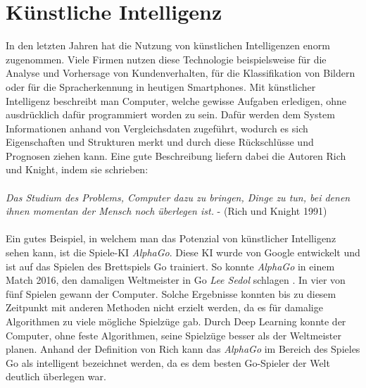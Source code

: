 \section{Künstliche Intelligenz}\label{s.ki}
In den letzten Jahren hat die Nutzung von künstlichen Intelligenzen enorm zugenommen. Viele Firmen nutzen diese Technologie beispielsweise für die Analyse und Vorhersage von Kundenverhalten, für die Klassifikation von Bildern oder für die Spracherkennung in heutigen Smartphones. Mit künstlicher Intelligenz beschreibt man Computer, welche gewisse Aufgaben erledigen, ohne ausdrücklich dafür programmiert worden zu sein. Dafür werden dem System Informationen anhand von Vergleichsdaten zugeführt, wodurch es sich Eigenschaften und Strukturen merkt und durch diese Rückschlüsse und Prognosen ziehen kann. Eine gute Beschreibung liefern dabei die Autoren Rich und Knight, indem sie schrieben:\\\\
 \textit{Das Studium des Problems, Computer dazu zu bringen, Dinge zu tun, bei denen ihnen momentan der Mensch noch überlegen ist.} - (Rich und Knight 1991)\\\\
Ein gutes Beispiel, in welchem man das Potenzial von künstlicher Intelligenz sehen kann, ist die Spiele-KI  \textit{AlphaGo}. Diese KI wurde von Google entwickelt und ist auf das Spielen des Brettspiels Go trainiert. So konnte \textit{AlphaGo} in einem Match 2016, den damaligen Weltmeister in Go \textit{Lee Sedol} schlagen \cite{Alpha2016GO}. In vier von fünf Spielen gewann der Computer. Solche Ergebnisse konnten bis zu diesem Zeitpunkt mit anderen Methoden nicht erzielt werden, da es für damalige Algorithmen zu viele mögliche Spielzüge gab. Durch Deep Learning konnte der Computer, ohne feste Algorithmen, seine Spielzüge besser als der Weltmeister planen. Anhand der Definition von Rich kann das  \textit{AlphaGo}  im Bereich des Spieles Go als intelligent bezeichnet werden, da es dem besten Go-Spieler der Welt deutlich überlegen war.
